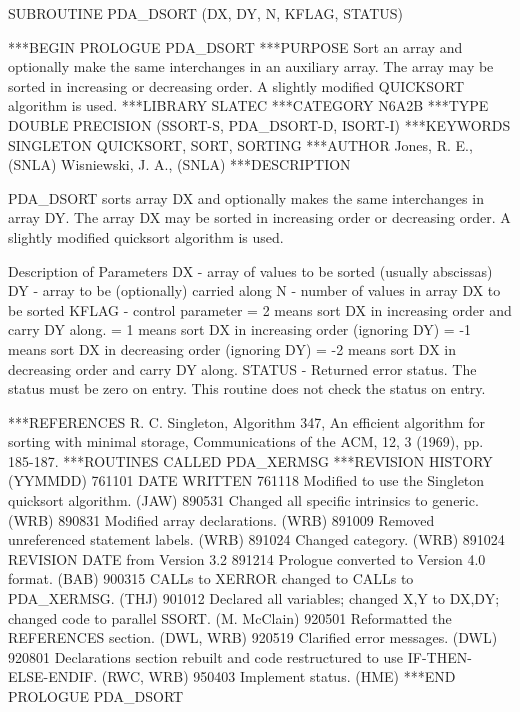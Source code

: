 \documentclass[11pt,twoside,nolof]{starlink}
\begin{document}
\begin{terminalv}
      SUBROUTINE PDA_DSORT (DX, DY, N, KFLAG, STATUS)


***BEGIN PROLOGUE  PDA_DSORT
***PURPOSE  Sort an array and optionally make the same interchanges in
            an auxiliary array.  The array may be sorted in increasing
            or decreasing order.  A slightly modified QUICKSORT
            algorithm is used.
***LIBRARY   SLATEC
***CATEGORY  N6A2B
***TYPE      DOUBLE PRECISION (SSORT-S, PDA_DSORT-D, ISORT-I)
***KEYWORDS  SINGLETON QUICKSORT, SORT, SORTING
***AUTHOR  Jones, R. E., (SNLA)
           Wisniewski, J. A., (SNLA)
***DESCRIPTION

   PDA_DSORT sorts array DX and optionally makes the same interchanges in
   array DY.  The array DX may be sorted in increasing order or
   decreasing order.  A slightly modified quicksort algorithm is used.

   Description of Parameters
      DX - array of values to be sorted   (usually abscissas)
      DY - array to be (optionally) carried along
      N  - number of values in array DX to be sorted
      KFLAG - control parameter
            =  2  means sort DX in increasing order and carry DY along.
            =  1  means sort DX in increasing order (ignoring DY)
            = -1  means sort DX in decreasing order (ignoring DY)
            = -2  means sort DX in decreasing order and carry DY along.
      STATUS - Returned error status.
               The status must be zero on entry. This
               routine does not check the status on entry.

***REFERENCES  R. C. Singleton, Algorithm 347, An efficient algorithm
                 for sorting with minimal storage, Communications of
                 the ACM, 12, 3 (1969), pp. 185-187.
***ROUTINES CALLED  PDA_XERMSG
***REVISION HISTORY  (YYMMDD)
   761101  DATE WRITTEN
   761118  Modified to use the Singleton quicksort algorithm.  (JAW)
   890531  Changed all specific intrinsics to generic.  (WRB)
   890831  Modified array declarations.  (WRB)
   891009  Removed unreferenced statement labels.  (WRB)
   891024  Changed category.  (WRB)
   891024  REVISION DATE from Version 3.2
   891214  Prologue converted to Version 4.0 format.  (BAB)
   900315  CALLs to XERROR changed to CALLs to PDA_XERMSG.  (THJ)
   901012  Declared all variables; changed X,Y to DX,DY; changed
           code to parallel SSORT. (M. McClain)
   920501  Reformatted the REFERENCES section.  (DWL, WRB)
   920519  Clarified error messages.  (DWL)
   920801  Declarations section rebuilt and code restructured to use
           IF-THEN-ELSE-ENDIF.  (RWC, WRB)
   950403  Implement status.  (HME)
***END PROLOGUE  PDA_DSORT
\end{terminalv}
\end{document}
